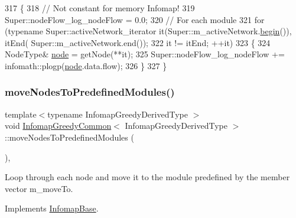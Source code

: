 \begin{DoxyCode}
317 \{
318     \textcolor{comment}{// Not constant for memory Infomap!}
319     Super::nodeFlow\_log\_nodeFlow = 0.0;
320     \textcolor{comment}{// For each module}
321     \textcolor{keywordflow}{for} (\textcolor{keyword}{typename} Super::activeNetwork\_iterator it(Super::m\_activeNetwork.\mbox{\hyperlink{namespacebegin}{begin}}()), itEnd(
      Super::m\_activeNetwork.end());
322             it != itEnd; ++it)
323     \{
324         NodeType& \mbox{\hyperlink{structnode}{node}} = getNode(**it);
325         Super::nodeFlow\_log\_nodeFlow += infomath::plogp(\mbox{\hyperlink{structnode}{node}}.data.flow);
326     \}
327 \}
\end{DoxyCode}
\mbox{\label{classInfomapGreedyCommon_affbdd4750e010adba7f1cd15a295303e}} 
\subsubsection{\texorpdfstring{move\+Nodes\+To\+Predefined\+Modules()}{moveNodesToPredefinedModules()}}
{\footnotesize\ttfamily template$<$typename Infomap\+Greedy\+Derived\+Type $>$ \\
void \mbox{\hyperlink{classInfomapGreedyCommon}{Infomap\+Greedy\+Common}}$<$ Infomap\+Greedy\+Derived\+Type $>$\+::move\+Nodes\+To\+Predefined\+Modules (\begin{DoxyParamCaption}{ }\end{DoxyParamCaption})\hspace{0.3cm}{\ttfamily [protected]}, {\ttfamily [virtual]}}

Loop through each node and move it to the module predefined by the member vector m\+\_\+move\+To. 

Implements \mbox{\hyperlink{classInfomapBase_ab085f56e93df121d113b5869a51824c9}{Infomap\+Base}}.



